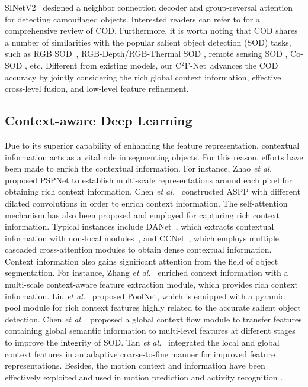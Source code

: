 \documentclass[lettersize,journal]{IEEEtran}
\newcommand{\ourM}{{C$^2$F-Net}}
\def\etal{{\em et al.}}
\def\etal{{\em et al.}}
\begin{document}
SINetV2~\cite{fan2021concealed} designed a neighbor connection decoder and group-reversal attention for detecting camouflaged objects.
Interested readers can refer to \cite{rethinking} for a comprehensive review of COD.
Furthermore, it is worth noting that COD shares a number of similarities with the popular salient object detection (SOD) tasks, such as RGB SOD~\cite{egnet}, RGB-Depth/RGB-Thermal SOD \cite{zhang2019rgb,chen2020dpanet,huang2021employing}, remote sensing SOD \cite{cong2021rrnet,zhang2020dense}, Co-SOD \cite{cong2017iterative,fan2021rethinking}, etc. 
Different from existing models, our \ourM~advances the COD accuracy by jointly considering the rich global context information, effective cross-level fusion, and low-level feature refinement.
\subsection{Context-aware Deep Learning}
Due to its superior capability of enhancing the feature representation, contextual information acts as a vital role in segmenting objects.
For this reason, efforts have been made to enrich the contextual information.
For instance, Zhao \etal~\cite{pspnet} proposed PSPNet to establish multi-scale representations around each pixel for obtaining rich context information.
Chen \etal~\cite{deeplab} constructed ASPP with different dilated convolutions in order to enrich context information.
The self-attention mechanism has also been proposed and employed for capturing rich context information. Typical instances include DANet~\cite{danet}, which extracts contextual information with non-local modules~\cite{nonlocal}, and CCNet~\cite{ccnet}, which employs multiple cascaded cross-attention modules to obtain dense contextual information.
Context information also gains significant attention from the field of object segmentation. For instance, Zhang \etal~\cite{bi} enriched context information with a multi-scale context-aware feature extraction module, which provides rich context information.
Liu \etal~\cite{poolnet} proposed PoolNet, which is equipped with a pyramid pool module for rich context features highly related to the accurate salient object detection.
Chen \etal~\cite{gcpanet} proposed a global context flow module to transfer features containing global semantic information to multi-level features at different stages to improve the integrity of SOD.
Tan \etal~\cite{lcanet} integrated the local and global context features in an adaptive coarse-to-fine manner for improved feature representations. Besides, the motion context and information have been effectively exploited and used in motion prediction \cite{shu2021spatiotemporal} and activity recognition \cite{shu2022expansion}. 
 
\end{document}
